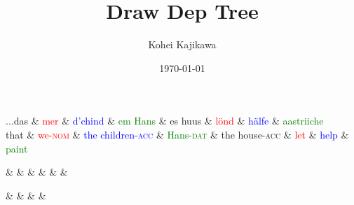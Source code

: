 \documentclass[dvipdfmx]{jsarticle}
\title{Draw Dep Tree}
\author{Kohei Kajikawa}
\date{\today}
\begin{document}
\maketitle

\begin{dependency}[arc edge, edge style={-}, arc angle=80, text only label, label style={above}, hide label]
    \begin{deptext}
       ...das \& \textcolor{red}{mer} \& \textcolor{blue}{d'chind} \& \textcolor{green}{em Hans} \& es huus \& \textcolor{red}{l\"{o}nd} \& \textcolor{blue}{h\"{a}lfe} \& \textcolor{green}{aastriiche} \\
       that \& \textcolor{red}{we-\textsc{nom}} \& \textcolor{blue}{the children-\textsc{acc}} \& \textcolor{green}{Hans-\textsc{dat}} \& the house-\textsc{acc} \& \textcolor{red}{let} \& \textcolor{blue}{help} \& \textcolor{green}{paint} \\
    \end{deptext}
\end{dependency}

\begin{dependency}[arc edge, edge style={-}, arc angle=80, text only label, label style={above}, hide label]
    \begin{deptext}
        \textcolor{red}{} \& \textcolor{blue}{} \& \textcolor{green}{} \&  \& \textcolor{green}{} \& \textcolor{blue}{} \& \textcolor{red}{} \\
    \end{deptext}
\end{dependency}

\begin{dependency}[arc edge, edge style={-}, arc angle=80, text only label, label style={above}, hide label]
    \begin{deptext}
        \textcolor{red}{} \& \textcolor{blue}{} \&  \& \textcolor{red}{} \& \textcolor{blue}{} \\
    \end{deptext}
\end{dependency}
\end{document}
